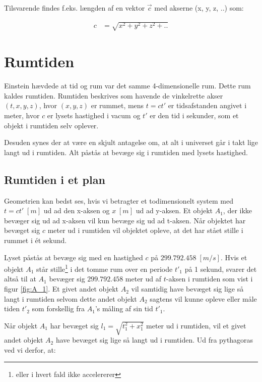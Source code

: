 \documentclass[11pt,a4paper]{memoir}
\begin{document}
Tilsvarende findes f.eks. længden af en vektor $\vec{c}$  med akserne (x, y, z, ..) som:

\begin{equation}
\begin{aligned}
c &= \sqrt{x^2 + y^2 + z^2 + ..}
\end{aligned}
\end{equation}

\FloatBarrier



\section{Rumtiden}
Einstein hævdede at tid og rum var det samme 4-dimensionelle rum. Dette rum kaldes rumtiden. Rumtiden beskrives som havende de vinkelrette akser $(t, x, y, z)$, hvor $(x, y, z)$ er rummet, mens $t = ct'$ er tidsafstanden angivet i meter, hvor $c$ er lysets hastighed i vacum og $t'$ er den tid i sekunder, som et objekt i rumtiden selv oplever.
\par
Desuden synes der at være en skjult antagelse om, at alt i universet går i takt lige langt ud i rumtiden. Alt påstås at bevæge sig i rumtiden med lysets hastighed.

\subsection{Rumtiden i et plan}
Geometrien kan bedst ses, hvis vi betragter et todimensionelt system med $t = ct'\;[m]$ ud ad den x-aksen og $x\;[m]$ ud ad y-aksen. Et objekt $A_1$, der ikke bevæger sig ud ad x-aksen vil kun bevæge sig ud ad t-aksen. Når objektet har bevæget sig $c$ meter ud i rumtiden vil objektet opleve, at det har stået stille i rummet i ét sekund.
\par
Lyset påstås at bevæge sig med en hastighed $c$ på $299.792.458\;[m/s]$. Hvis et objekt $A_1$ står stille\footnote{eller i hvert fald ikke accelererer} i det tomme rum over en periode  $t'_1$ på 1 sekund, svarer det altså til at $A_1$ bevæger sig $299.792.458$ meter ud af $t$-aksen i rumtiden som vist i figur \ref{fig:A_1}. Et givet andet objekt $A_2$ vil samtidig have bevæget sig lige så langt i rumtiden selvom dette andet objekt $A_2$ sagtens vil kunne opleve eller måle tiden $t'_2$ som forskellig fra $A_1$'s måling af sin tid $t'_1$.
\par
Når objekt $A_1$ har bevæget sig $l_1 = \sqrt{t_1^2 + x_1^2}$ meter ud i rumtiden, vil et givet andet objekt $A_2$ have bevæget sig lige så langt ud i rumtiden. Ud fra pythagoras ved vi derfor, at:
\end{document}
